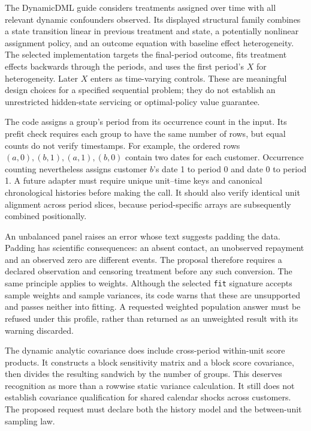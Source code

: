 The DynamicDML guide considers treatments assigned over time with all relevant
dynamic confounders observed. Its displayed structural family combines a
state transition linear in previous treatment and state, a potentially
nonlinear assignment policy, and an outcome equation with baseline effect
heterogeneity. The selected implementation targets the final-period outcome,
fits treatment effects backwards through the periods, and uses the first
period's $X$ for heterogeneity. Later $X$ enters as time-varying controls.
These are meaningful design choices for a specified sequential problem; they
do not establish an unrestricted hidden-state servicing or optimal-policy
value guarantee.~\citep{exec19_econml_source}

The code assigns a group's period from its occurrence count in the input.
Its prefit check requires each group to have the same number of rows, but
equal counts do not verify timestamps. For example, the ordered rows
$(a,0),(b,1),(a,1),(b,0)$ contain two dates for each customer. Occurrence
counting nevertheless assigns customer $b$'s date 1 to period 0 and date 0
to period 1. A future adapter must require unique unit--time keys and
canonical chronological histories before making the call. It should also
verify identical unit alignment across period slices, because period-specific
arrays are subsequently combined positionally.
\citep{exec19_econml_source,exec19_econml_reference}

An unbalanced panel raises an error whose text suggests padding the data.
Padding has scientific consequences: an absent contact, an unobserved
repayment and an observed zero are different events. The proposal therefore
requires a declared observation and censoring treatment before any such
conversion. The same principle applies to weights. Although the selected
\texttt{fit} signature accepts sample weights and sample variances, its code
warns that these are unsupported and passes neither into fitting. A requested
weighted population answer must be refused under this profile, rather than
returned as an unweighted result with its warning discarded.
\citep{exec19_econml_source}

The dynamic analytic covariance does include cross-period within-unit score
products. It constructs a block sensitivity matrix and a block score
covariance, then divides the resulting sandwich by the number of groups.
This deserves recognition as more than a rowwise static variance calculation.
It still does not establish covariance qualification for shared calendar
shocks across customers. The proposed request must declare both the history
model and the between-unit sampling law.~\citep{exec19_econml_source}

